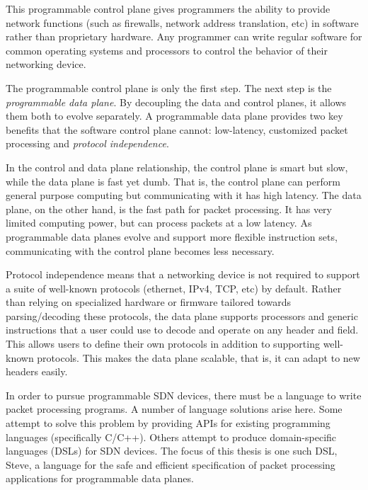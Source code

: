 This programmable control plane gives programmers the ability to
provide network functions (such as firewalls, network address translation, etc) in 
software rather than proprietary hardware.
Any programmer can write regular software for common operating
systems and processors to control the behavior of their networking device.

The programmable control plane is only the first step. The next
step is the \emph{programmable data plane}. By decoupling the data and control planes, 
it allows them both to evolve separately. A programmable data plane provides
two key benefits that the software control plane cannot: low-latency, customized packet processing and \emph{protocol independence}.

In the control and data plane relationship,
the control plane is smart but slow, while the data plane is fast yet dumb. That is,
the control plane can perform general purpose computing but communicating with
it has high latency. The data plane, on the other hand, is the fast path for packet processing.
It has very limited computing power, but can process packets at a low latency.
As programmable data planes evolve and support more flexible instruction sets,
communicating with the control plane becomes less necessary.

Protocol independence means that a networking device is not required to support
a suite of well-known protocols (ethernet, IPv4, TCP, etc) by default.
Rather than relying on specialized hardware or firmware tailored towards parsing/decoding
these protocols, the data plane supports processors
and generic instructions that a user could use to decode and operate on
any header and field.
This allows users to define their own protocols in addition to
supporting well-known protocols. This makes the data plane scalable, that is, it
can adapt to new headers easily.

In order to pursue programmable SDN devices, there must be a language to write
packet processing programs. A number of language solutions arise here.
Some attempt to solve this problem by providing APIs for existing programming languages
(specifically C/C++).
Others attempt to produce domain-specific languages (DSLs) for SDN devices.
The focus of this thesis is one such DSL, Steve, a language for the safe and
efficient specification of packet processing applications for programmable data planes.




